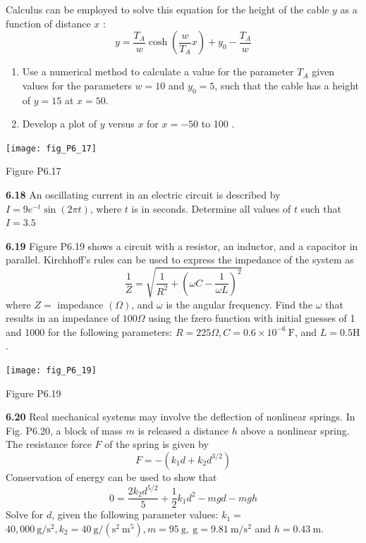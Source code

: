 \documentclass[../main.tex]{subfiles}
\begin{document}
\begin{multicols}{2}
    Calculus can be employed to solve this equation for the height of the cable $y$ as a function of distance $x$ :
    $$
    y=\frac{T_{A}}{w} \cosh \left(\frac{w}{T_{A}} x\right)+y_{0}-\frac{T_{A}}{w}
    $$
    \begin{enumerate}[label=(\alph*)]
        \item Use a numerical method to calculate a value for the parameter $T_{A}$ given values for the parameters $w=10$ and $y_{0}=5$, such that the cable has a height of $y=15$ at $x=50$.
        \item  Develop a plot of $y$ versus $x$ for $x=-50$ to 100 .
    \end{enumerate}

    \begin{center}
        \texttt{[image: fig\_P6\_17]}
    
        \textsf{Figure P6.17}
    \end{center}
    
    \noindent\textbf{6.18} An oscillating current in an electric circuit is described by $I=9 e^{-t} \sin (2 \pi t)$, where $t$ is in seconds. Determine all values of $t$ such that $I=3.5$
    
    \noindent\textbf{6.19} Figure P6.19 shows a circuit with a resistor, an inductor, and a capacitor in parallel. Kirchhoff's rules can be used to express the impedance of the system as
    $$
    \frac{1}{Z}=\sqrt{\frac{1}{R^{2}}+\left(\omega C-\frac{1}{\omega L}\right)^{2}}
    $$
    where $Z=$ impedance $(\Omega)$, and $\omega$ is the angular frequency. Find the $\omega$ that results in an impedance of $100 \Omega$ using the fzero function with initial guesses of 1 and 1000 for the following parameters: $R=225 \Omega, C=0.6 \times 10^{-6} \mathrm{~F}$, and $L=0.5 \mathrm{H}$.

    \begin{center}
        \texttt{[image: fig\_P6\_19]}
    
        \textsf{Figure P6.19}
    \end{center}

    \noindent\textbf{6.20} Real mechanical systems may involve the deflection of nonlinear springs. In Fig. P6.20, a block of mass $m$ is released a distance $h$ above a nonlinear spring. The resistance force $F$ of the spring is given by
    $$
    F=-\left(k_{1} d+k_{2} d^{3 / 2}\right)
    $$
    Conservation of energy can be used to show that
    $$
    0=\frac{2 k_{2} d^{5 / 2}}{5}+\frac{1}{2} k_{1} d^{2}-m g d-m g h
    $$
    Solve for $d$, given the following parameter values: $k_{1}=$ $40,000 \mathrm{~g} / \mathrm{s}^{2}, k_{2}=40 \mathrm{~g} /\left(\mathrm{s}^{2} \mathrm{~m}^{5}\right), m=95 \mathrm{~g}, \mathrm{~g}=9.81 \mathrm{~m} / \mathrm{s}^{2}$ and $h=0.43 \mathrm{~m}$.
    

\end{multicols}
\end{document}
